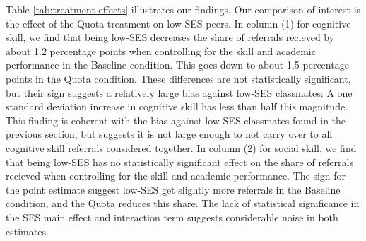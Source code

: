 \documentclass[11pt,a4paper,oneside]{article}
\begin{document}
   Table \ref{tab:treatment-effects} illustrates our findings. Our comparison of interest is the effect of the Quota treatment on low-SES peers. In column (1) for cognitive skill, we find that being low-SES decreases the share of referrals recieved by about 1.2 percentage points when controlling for the skill and academic performance in the Baseline condition. This goes down to about 1.5 percentage points in the Quota condition. These differences are not statistically significant, but their sign suggests a relatively large bias against low-SES classmates: A one standard deviation increase in cognitive skill has less than half this magnitude. This finding is coherent with the bias against low-SES classmates found in the previous section, but suggests it is not large enough to not carry over to all cognitive skill referrals considered together. In column (2) for social skill, we find that being low-SES has no statistically significant effect on the share of referrals recieved when controlling for the skill and academic performance. The sign for the point estimate suggest low-SES get slightly more referrals in the Baseline condition, and the Quota reduces this share. The lack of statistical significance in the SES main effect and interaction term suggests considerable noise in both estimates.
\end{document}
